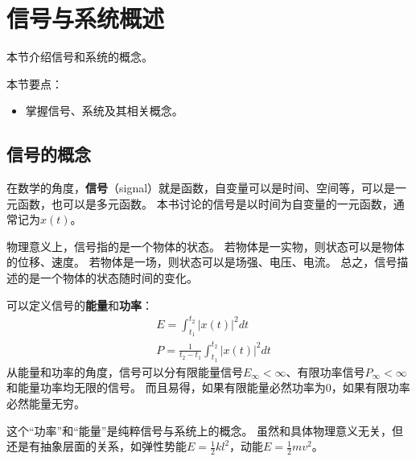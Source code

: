 \section{信号与系统概述}

本节介绍信号和系统的概念。

本节要点：
\begin{itemize}
    \item 掌握信号、系统及其相关概念。
\end{itemize}

\subsection{信号的概念}

\begin{definition}[信号]
在数学的角度，{\bf 信号}（signal）就是函数，自变量可以是时间、空间等，可以是一元函数，也可以是多元函数。
本书讨论的信号是以时间为自变量的一元函数，通常记为$x\left( t \right) $。
\end{definition}

物理意义上，信号指的是一个物体的状态。
若物体是一实物，则状态可以是物体的位移、速度。
若物体是一场，则状态可以是场强、电压、电流。
总之，信号描述的是一个物体的状态随时间的变化。

可以定义信号的{\bf 能量}和{\bf 功率}：
\begin{align*}
&E=\int_{t_1}^{t_2}{\left| x\left( t \right) \right|^2dt} \\
&P=\frac{1}{t_2-t_1}\int_{t_1}^{t_2}{\left| x\left( t \right) \right|^2dt}
\end{align*}
从能量和功率的角度，信号可以分有限能量信号$E_{\infty}<\infty $、有限功率信号$P_{\infty}<\infty $和能量功率均无限的信号。
而且易得，如果有限能量必然功率为0，如果有限功率必然能量无穷。

这个“功率”和“能量”是纯粹信号与系统上的概念。
虽然和具体物理意义无关，但还是有抽象层面的关系，如弹性势能$E=\frac{1}{2}kl^2$，动能$E=\frac{1}{2}mv^2$。

~

